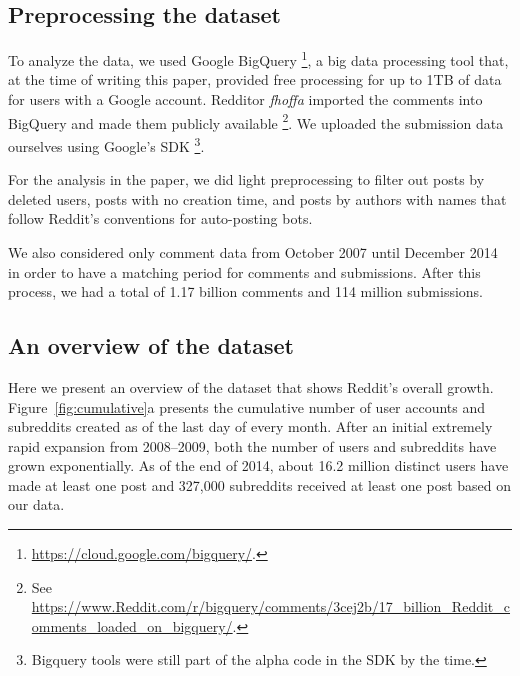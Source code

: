 \subsection{Preprocessing the dataset}

To analyze the data, we used Google BigQuery \footnote{\url{https://cloud.google.com/bigquery/}.}, a big data processing tool that, at the time of writing this paper, provided free processing for up to 1TB of data for users with a Google account.  Redditor \textit{fhoffa} imported the comments into BigQuery and made them publicly available \footnote{See \url{https://www.Reddit.com/r/bigquery/comments/3cej2b/17_billion_Reddit_comments_loaded_on_bigquery/}.}.  We uploaded the submission data ourselves using Google's SDK \footnote{Bigquery tools were still part of the alpha code in the SDK by the time.}.


For the analysis in the paper, we did light preprocessing to filter out posts by deleted users, posts with no creation time, and posts by authors with names that follow Reddit's conventions for auto-posting bots. 

We also considered only comment data from October 2007 until December 2014 in order to have a matching period for comments and submissions. After this process, we had a total of 1.17 billion comments and 114 million submissions.

\begin{figure*}[!tb]
\centering
{}
\caption{Figure a shows the cumulative growth of Reddit for users and subreddits. Figure b shows the number of active users and subreddits in Reddit over time. An active user or subreddit is one that had at least one post (comment or submission) in the time bin we used---here, discretized by month.}
\label{fig:cumulative}
\end{figure*}

\subsection{An overview of the dataset}

Here we present an overview of the dataset that shows Reddit's overall growth.  Figure~\ref{fig:cumulative}a presents the cumulative number of user accounts and subreddits created as of the last day of every month. After an initial extremely rapid expansion from 2008--2009, both the number of users and subreddits have grown exponentially.  As of the end of 2014, about 16.2 million distinct users have made at least one post and 327,000 subreddits received at least one post based on our data.

